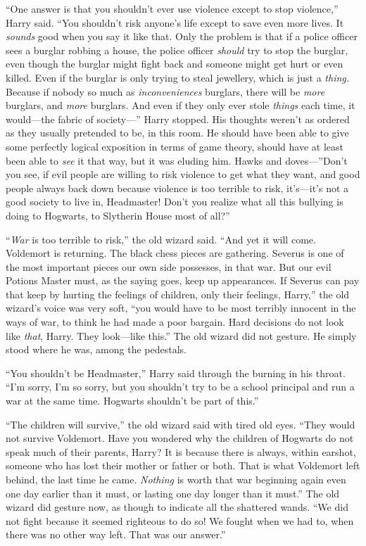 “One answer is that you shouldn’t ever use violence except to stop violence,” Harry said. “You shouldn’t risk anyone’s life except to save even more lives. It \emph{sounds} good when you say it like that. Only the problem is that if a police officer sees a burglar robbing a house, the police officer \emph{should} try to stop the burglar, even though the burglar might fight back and someone might get hurt or even killed. Even if the burglar is only trying to steal jewellery, which is just a \emph{thing.} Because if nobody so much as \emph{inconveniences} burglars, there will be \emph{more} burglars, and \emph{more} burglars. And even if they only ever stole \emph{things} each time, it would—the fabric of society—” Harry stopped. His thoughts weren’t as ordered as they usually pretended to be, in this room. He should have been able to give some perfectly logical exposition in terms of game theory, should have at least been able to \emph{see} it that way, but it was eluding him. Hawks and doves—”Don’t you see, if evil people are willing to risk violence to get what they want, and good people always back down because violence is too terrible to risk, it’s—it’s not a good society to live in, Headmaster! Don’t you realize what all this bullying is doing to Hogwarts, to Slytherin House most of all?”

“\emph{War} is too terrible to risk,” the old wizard said. “And yet it will come. Voldemort is returning. The black chess pieces are gathering. Severus is one of the most important pieces our own side possesses, in that war. But our evil Potions Master must, as the saying goes, keep up appearances. If Severus can pay that keep by hurting the feelings of children, only their feelings, Harry,” the old wizard’s voice was very soft, “you would have to be most terribly innocent in the ways of war, to think he had made a poor bargain. Hard decisions do not look like \emph{that}, Harry. They look—like this.” The old wizard did not gesture. He simply stood where he was, among the pedestals.

“You shouldn’t be Headmaster,” Harry said through the burning in his throat. “I’m sorry, I’m so sorry, but you shouldn’t try to be a school principal and run a war at the same time. Hogwarts shouldn’t be part of this.”

“The children will survive,” the old wizard said with tired old eyes. “They would not survive Voldemort. Have you wondered why the children of Hogwarts do not speak much of their parents, Harry? It is because there is always, within earshot, someone who has lost their mother or father or both. That is what Voldemort left behind, the last time he came. \emph{Nothing} is worth that war beginning again even one day earlier than it must, or lasting one day longer than it must.” The old wizard did gesture now, as though to indicate all the shattered wands. “We did not fight because it seemed righteous to do so! We fought when we had to, when there was no other way left. That was our answer.”

